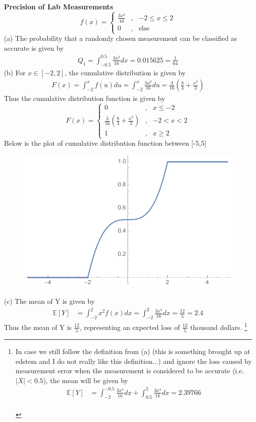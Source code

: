 \documentclass{homeworg}
\begin{document}
\exercise 
\textbf{Precision of Lab Measurements} \\
$$ f(x)=\left\{
\begin{aligned}
\frac{3x^2}{16} &, & -2\leq x \leq 2\\
0 &,& \text{else}
\end{aligned}
\right.
$$
(a) The probability that a randomly chosen measurement can be classified as accurate is given by 
\begin{align*}
Q_1=\int_{-0.5}^{0.5} \frac{3x^2}{16}dx=0.015625=\frac{1}{64}
\end{align*}
(b) For $x\in [-2,2]$, the cumulative distribution is given by 
\begin{align*}
F(x)=\int_{-2}^{x}f(u)du=\int_{-2}^{x}\frac{3u^2}{16}du=\frac{3}{16}(\frac{8}{3}+\frac{x^3}{3})
\end{align*}
Thus the cumulative distribution function is given by 
$$ F(x)=\left\{
\begin{aligned}
0 &, &  x \leq -2\\
\frac{3}{16}(\frac{8}{3}+\frac{x^3}{3}) &,& -2<x<2 \\
1 &,& x\geq 2
\end{aligned}
\right.
$$
Below is the plot of cumulative distribution function between [-5,5] 
\begin{figure}[h]
\centering
\includegraphics[]{q2_1.pdf}
\end{figure}
(c)  The mean of Y is given by 
\begin{align*}
\mathbb{E}[Y]&=\int_{-2}^{2}x^2f(x)dx=\int_{-2}^{2}\frac{3x^4}{16}dx=\frac{12}{5}=2.4
\end{align*}
Thus the mean of Y is $\frac{12}{5}$, representing an expected loss of $\frac{12}{5}$ thousand dollars. \footnote{In case we still follow the definition from (a) (this is something brought up at edstem and I do not really like this definition...) and ignore the loss caused by measurement error when the measurement is considered to be accurate (i.e. $|X|<0.5$), the mean will be given by 
	\begin{align*}
	\mathbb{E}[Y]&=\int_{-2}^{-0.5}\frac{3x^4}{16}dx+\int_{0.5}^{2}\frac{3x^4}{16}dx=2.39766
	\end{align*}\\}
\end{document}
